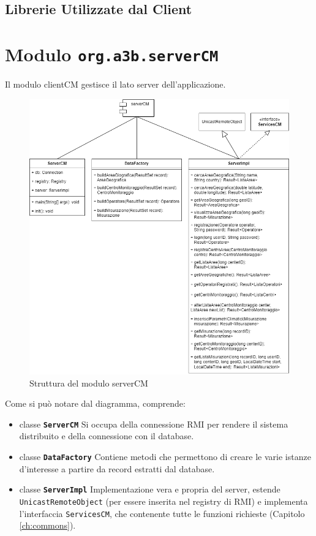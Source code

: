\section{Librerie Utilizzate dal Client}

\chapter{Modulo \texttt{org.a3b.serverCM}}
Il modulo clientCM gestisce il lato server dell'applicazione.
\label{ch:server}
\begin{figure}[h]
	\centering
	\caption{Struttura del modulo serverCM}
	\label{fig:severcm}
	\includegraphics[width=0.9\linewidth]{../../fig/img/tecnico/ServerCM.drawio}
\end{figure}
\pagebreak

Come si può notare dal diagramma, comprende:
\begin{itemize}
	\item classe \textbf{\texttt{ServerCM}}
		Si occupa della connessione RMI per rendere il sistema distribuito e della connessione con il database.
	\item classe \textbf{\texttt{DataFactory}}
		Contiene metodi che permettono di creare le varie istanze d'interesse a partire da record estratti dal database. 
	\item classe \textbf{\texttt{ServerImpl}}
		Implementazione vera e propria del server, estende \texttt{UnicastRemoteObject} (per essere inserita nel registry di RMI) e implementa l'interfaccia \texttt{ServicesCM}, che contenente tutte le funzioni richieste (Capitolo \ref{ch:commons}).
\end{itemize}

